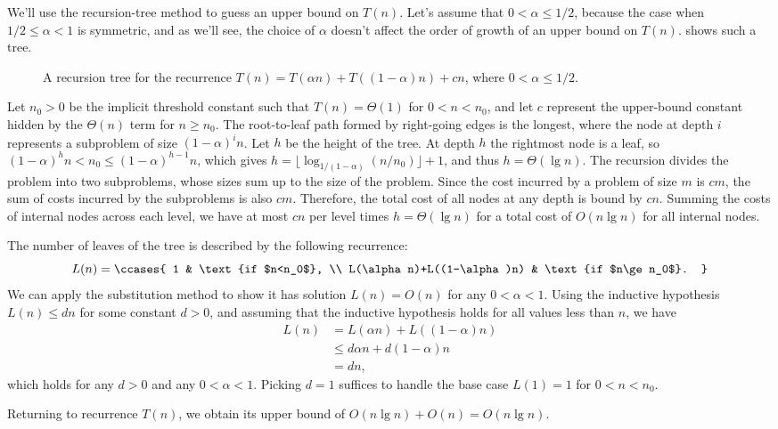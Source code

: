 We'll use the recursion-tree method to guess an upper bound on $T(n)$.
Let's assume that $0<\alpha\le1/2$, because the case when $1/2\le\alpha<1$ is symmetric, and as we'll see, the choice of $\alpha$ doesn't affect the order of growth of an upper bound on $T(n)$.
 shows such a tree.
\begin{figure}[htb]
    
    \caption{A recursion tree for the recurrence $T(n)=T(\alpha n)+T((1-\alpha)n)+cn$, where $0<\alpha\le1/2$.} \label{fig:4.4-4}
\end{figure}

Let $n_0>0$ be the implicit threshold constant such that $T(n)=\Theta(1)$ for $0<n<n_0$, and let $c$ represent the upper-bound constant hidden by the $\Theta(n)$ term for $n\ge n_0$.
The root-to-leaf path formed by right-going edges is the longest, where the node at depth $i$ represents a subproblem of size $(1-\alpha)^in$.
Let $h$ be the height of the tree.
At depth $h$ the rightmost node is a leaf, so $(1-\alpha)^hn<n_0\le(1-\alpha)^{h-1}n$, which gives $h=\lfloor\log_{1/(1-\alpha)}(n/n_0)\rfloor+1$, and thus $h=\Theta(\lg n)$.
The recursion divides the problem into two subproblems, whose sizes sum up to the size of the problem.
Since the cost incurred by a problem of size $m$ is $cm$, the sum of costs incurred by the subproblems is also $cm$.
Therefore, the total cost of all nodes at any depth is bound by $cn$.
Summing the costs of internal nodes across each level, we have at most $cn$ per level times $h=\Theta(\lg n)$ for a total cost of $O(n\lg n)$ for all internal nodes.

The number of leaves of the tree is described by the following recurrence:
\[
    L(n) =
    \ccases{
        1 & \text{if $n<n_0$}, \\
        L(\alpha n)+L((1-\alpha)n) & \text{if $n\ge n_0$}.
    }
\]
We can apply the substitution method to show it has solution $L(n)=O(n)$ for any $0<\alpha<1$.
Using the inductive hypothesis $L(n)\le dn$ for some constant $d>0$, and assuming that the inductive hypothesis holds for all values less than $n$, we have
\begin{align*}
    L(n) &= L(\alpha n)+L((1-\alpha)n) \\
    &\le d\alpha n+d(1-\alpha)n \\
    &= dn,
\end{align*}
which holds for any $d>0$ and any $0<\alpha<1$.
Picking $d=1$ suffices to handle the base case $L(1)=1$ for $0<n<n_0$.

Returning to recurrence $T(n)$, we obtain its upper bound of $O(n\lg n)+O(n)=O(n\lg n)$.
